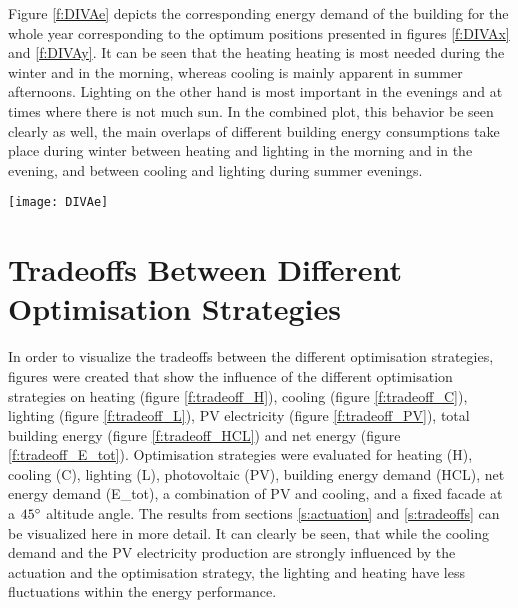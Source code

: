 	Figure \ref{f:DIVAe} depicts the corresponding energy demand of the building for the whole year corresponding to the optimum positions presented in figures \ref{f:DIVAx} and \ref{f:DIVAy}. It can be seen that the heating heating is most needed during the winter and in the morning, whereas cooling is mainly apparent in summer afternoons. Lighting on the other hand is most important in the evenings and at times where there is not much sun. In the combined plot, this behavior be seen clearly as well, the main overlaps of different building energy consumptions take place during winter between heating and lighting in the morning and in the evening, and between cooling and lighting during summer evenings. 

	\begin{figure*}
		\begin{center}
		\texttt{[image: DIVAe]}
		\caption{Carpet plots detailing the net energy consumption. Each square represents the total energy consumption for that specific hour of the entire month. Red colours detail the energy demand, while blue colours detail the energy supply.}
		\label{f:DIVAe}
		\end{center}
	\end{figure*}
	
\section{Tradeoffs Between Different Optimisation Strategies}
\label{a:tradeoffs}
	
	In order to visualize the tradeoffs between the different optimisation strategies, figures were created that show the influence of the different optimisation strategies on heating (figure \ref{f:tradeoff_H}), cooling (figure \ref{f:tradeoff_C}), lighting (figure \ref{f:tradeoff_L}), PV electricity (figure \ref{f:tradeoff_PV}), total building energy (figure \ref{f:tradeoff_HCL}) and net energy (figure \ref{f:tradeoff_E_tot}). Optimisation strategies were evaluated for heating (H), cooling (C), lighting (L), photovoltaic (PV), building energy demand (HCL), net energy demand (E\_tot), a combination of PV and cooling, and a fixed facade at a $45\degree$ altitude angle. The results from sections \ref{s:actuation} and \ref{s:tradeoffs} can be visualized here in more detail. It can clearly be seen, that while the cooling demand and the PV electricity production are strongly influenced by the actuation and the optimisation strategy, the lighting and heating have less fluctuations within the energy performance. 

